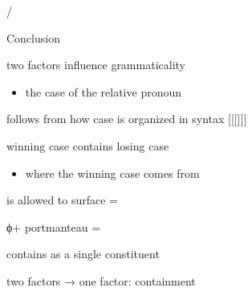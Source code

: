 \documentclass[xcolor=dvipsnames,10pt]{beamer}
\begin{document}
\begin{frame}[t]{/}
\begin{multicols}{2}
\end{multicols}

\end{frame}


\begin{frame}[t]{Conclusion}

\pause

two factors influence grammaticality

\pause

\begin{itemize}
  \item {the case of the relative pronoun}
\end{itemize}

\pause

  \center
  follows from how case is organized in syntax [[[]]]

  winning case contains losing case

\vspace{1em}

\pause

\begin{itemize}
  \item {where the winning case comes from}
\end{itemize}

\pause

  \center
   is allowed to surface =

  ϕ+ portmanteau =

   contains  as a single constituent

\pause
\vspace{1em}

\raggedright

two factors → one factor: containment


\end{frame}
\end{document}
